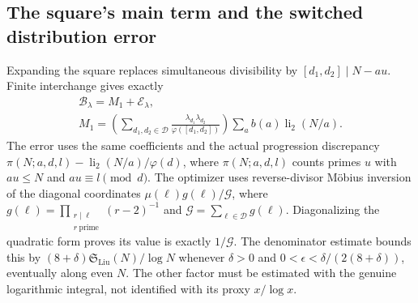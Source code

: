 \subsection{The square's main term and the switched distribution error}
Expanding the square replaces simultaneous divisibility by
$[d_1,d_2]\mid N-au$.  Finite interchange gives exactly
\[\begin{gathered}
 \mathcal B_\lambda=M_1+\mathcal E_\lambda,\\
 M_1=\left(\sum_{d_1,d_2\in\mathcal D}
     \frac{\lambda_{d_1}\lambda_{d_2}}{\varphi([d_1,d_2])}\right)
       \sum_a b(a)\operatorname{li}_2(N/a).
\end{gathered}\]
The error uses the same coefficients and the actual progression discrepancy
$\pi(N;a,d,l)-\operatorname{li}_2(N/a)/\varphi(d)$, where
$\pi(N;a,d,l)$ counts primes $u$ with $au\le N$ and $au\equiv l\pmod d$.
The optimizer uses reverse-divisor M\"obius inversion of the diagonal coordinates $\mu(\ell)g(\ell)/\mathcal G$, where
$g(\ell)=\prod_{\substack{r\mid\ell\\r\ \text{prime}}}(r-2)^{-1}$ and
$\mathcal G=\sum_{\ell\in\mathcal D}g(\ell)$.
Diagonalizing the quadratic form proves its value is exactly $1/\mathcal G$.
The denominator estimate bounds this by
$(8+\delta)\mathfrak S_{\mathrm{Liu}}(N)/\log N$ whenever
$\delta>0$ and $0<\epsilon<\delta/(2(8+\delta))$, eventually along even $N$.
The other factor must be estimated with the genuine logarithmic integral,
not identified with its proxy $x/\log x$.

